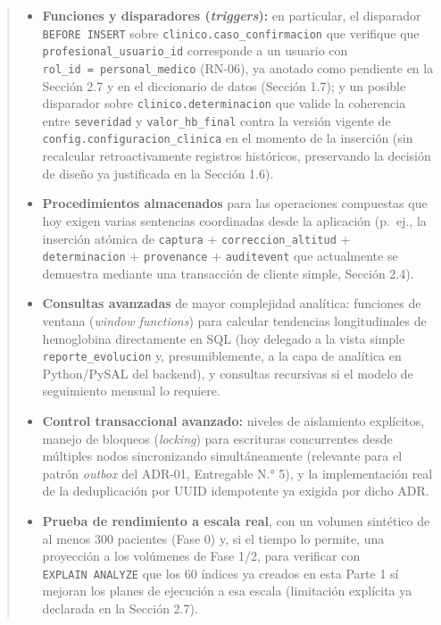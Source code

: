 \documentclass[11pt,a4paper]{article}
\providecommand{\tightlist}{%
  \setlength{\itemsep}{0pt}\setlength{\parskip}{0pt}}
\begin{document}
\begin{quote}
\begin{itemize}
\tightlist
\item
  \textbf{Funciones y disparadores (\emph{triggers}):} en particular, el disparador \texttt{BEFORE\ INSERT} sobre \texttt{clinico.caso\_confirmacion} que verifique que \texttt{profesional\_usuario\_id} corresponde a un usuario con \texttt{rol\_id\ =\ personal\_medico} (RN-06), ya anotado como pendiente en la Sección 2.7 y en el diccionario de datos (Sección 1.7); y un posible disparador sobre \texttt{clinico.determinacion} que valide la coherencia entre \texttt{severidad} y \texttt{valor\_hb\_final} contra la versión vigente de \texttt{config.configuracion\_clinica} en el momento de la inserción (sin recalcular retroactivamente registros históricos, preservando la decisión de diseño ya justificada en la Sección 1.6).
\item
  \textbf{Procedimientos almacenados} para las operaciones compuestas que hoy exigen varias sentencias coordinadas desde la aplicación (p.~ej., la inserción atómica de \texttt{captura} + \texttt{correccion\_altitud} + \texttt{determinacion} + \texttt{provenance} + \texttt{auditevent} que actualmente se demuestra mediante una transacción de cliente simple, Sección 2.4).
\item
  \textbf{Consultas avanzadas} de mayor complejidad analítica: funciones de ventana (\emph{window functions}) para calcular tendencias longitudinales de hemoglobina directamente en SQL (hoy delegado a la vista simple \texttt{reporte\_evolucion} y, presumiblemente, a la capa de analítica en Python/PySAL del backend), y consultas recursivas si el modelo de seguimiento mensual lo requiere.
\item
  \textbf{Control transaccional avanzado:} niveles de aislamiento explícitos, manejo de bloqueos (\emph{locking}) para escrituras concurrentes desde múltiples nodos sincronizando simultáneamente (relevante para el patrón \emph{outbox} del ADR-01, Entregable N.° 5), y la implementación real de la deduplicación por UUID idempotente ya exigida por dicho ADR.
\item
  \textbf{Prueba de rendimiento a escala real}, con un volumen sintético de al menos 300 pacientes (Fase 0) y, si el tiempo lo permite, una proyección a los volúmenes de Fase 1/2, para verificar con \texttt{EXPLAIN\ ANALYZE} que los 60 índices ya creados en esta Parte 1 sí mejoran los planes de ejecución a esa escala (limitación explícita ya declarada en la Sección 2.7).
\end{itemize}
\end{quote}
\end{document}
